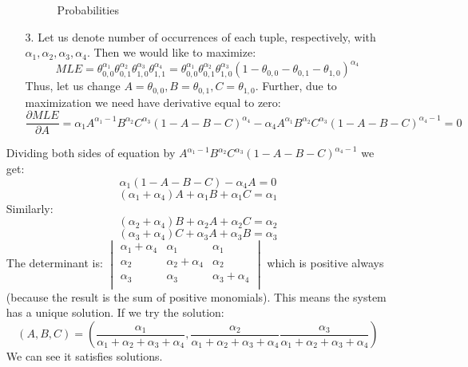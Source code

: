 \documentclass[10pt,a4paper]{article}
\begin{document}
\begin{enumerate}
\begin{enumerate}
\begin{figure}[htb!]
\begin{center}
\begin{tabular}{c|cc}
\end{tabular} 
\end{center}
\caption{Probabilities}
\label{fig:prediction}
\end{figure} 
\item[3.]
Let us denote number of occurrences  of each tuple, respectively, with $\alpha_1, \alpha_2, \alpha_3, \alpha_4$. Then we would like to maximize:
$$MLE=\theta_{0,0}^{\alpha_1}\theta_{0, 1}^{\alpha_2}\theta_{1, 0}^{\alpha_3}\theta_{1, 1}^{\alpha_4} =\theta_{0,0}^{\alpha_1}\theta_{0, 1}^{\alpha_2}\theta_{1, 0}^{\alpha_3}(1-\theta_{0, 0}-\theta_{0, 1}-\theta_{1, 0})^{\alpha_4}$$ 
Thus, let us change $A = \theta_{0, 0}, B=\theta_{0, 1}, C=\theta_{1, 0}$. Further, due to maximization we need have derivative equal to zero:
$$\frac{\partial MLE}{\partial A} =\alpha_1 A^{\alpha_1-1}B^{\alpha_2}C^{\alpha_3}(1-A-B-C)^{\alpha_4} -\alpha_4 A^{\alpha_1}B^{\alpha_2}C^{\alpha_3}(1-A-B-C)^{\alpha_4 -1}=0 $$
\end{enumerate}
Dividing both sides of equation by $A^{\alpha_1-1}B^{\alpha_2}C^{\alpha_3}(1-A-B-C)^{\alpha_4 -1}$ we get:
$$\alpha_1(1-A-B-C)-\alpha_4A=0$$
$$(\alpha_1 + \alpha_4 )A + \alpha_1B +\alpha_1C = \alpha_1$$
Similarly:
$$(\alpha_2 + \alpha_4 )B + \alpha_2A +\alpha_2C = \alpha_2$$
$$(\alpha_3 + \alpha_4 )C + \alpha_3A +\alpha_3B = \alpha_3$$
The determinant is:
$\begin{vmatrix}
\alpha_1 + \alpha_4 & \alpha_1 & \alpha_1 \\ 
\alpha_2 & \alpha_2 + \alpha_4 & \alpha_2 \\ 
\alpha_3 & \alpha_3 &  \alpha_3 + \alpha_4\\ 
\end{vmatrix}$
which is positive always (because the result is the sum of positive monomials).
This means the system has a unique solution.
If we try the solution: $$(A, B, C) = \left(\frac{\alpha_1}{\alpha_1 + \alpha_2+\alpha_3+\alpha_4},
 \frac{\alpha_2}{\alpha_1 + \alpha_2+\alpha_3+\alpha_4}
 \frac{\alpha_3}{\alpha_1 + \alpha_2+\alpha_3+\alpha_4}\right)$$ We can see it satisfies solutions. 
\end{enumerate}
\end{document}
